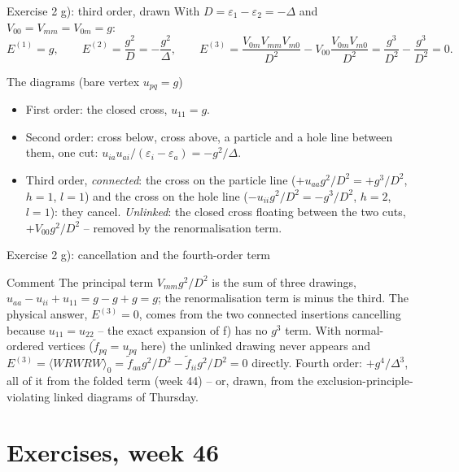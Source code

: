 \documentclass[aspectratio=169,10pt]{beamer}
\newcommand{\av}[1]{\langle #1\rangle_0}
\newcommand{\ftil}[1]{\tilde f_{#1}}
\begin{document}
\begin{frame}{Exercise 2 g): third order, drawn}
With $D=\varepsilon_1-\varepsilon_2=-\Delta$ and $V_{00}=V_{mm}=V_{0m}=g$:
\[
E^{(1)}=g,\qquad E^{(2)}=\frac{g^2}{D}=-\frac{g^2}{\Delta},\qquad
E^{(3)}=\frac{V_{0m}V_{mm}V_{m0}}{D^2}-V_{00}\frac{V_{0m}V_{m0}}{D^2}=\frac{g^3}{D^2}-\frac{g^3}{D^2}=0 .
\]
\begin{block}{The diagrams (bare vertex $u_{pq}=g$)}
\begin{itemize}
\item First order: the closed cross, $u_{11}=g$.
\item Second order: cross below, cross above, a particle and a hole line between them, one cut: $u_{ia}u_{ai}/(\varepsilon_i-\varepsilon_a)=-g^2/\Delta$.
\item Third order, \emph{connected}: the cross on the particle line ($+u_{aa}g^2/D^2=+g^3/D^2$, $h=1$, $l=1$) and the cross on the hole line ($-u_{ii}g^2/D^2=-g^3/D^2$, $h=2$, $l=1$): they cancel. \emph{Unlinked}: the closed cross floating between the two cuts, $+V_{00}g^2/D^2$ -- removed by the renormalisation term.
\end{itemize}
\end{block}
\end{frame}

\begin{frame}{Exercise 2 g): cancellation and the fourth-order term}
\begin{block}{Comment}
The principal term $V_{mm}g^2/D^2$ is the sum of three drawings, $u_{aa}-u_{ii}+u_{11}=g-g+g=g$; the renormalisation term is minus the third. The physical answer, $E^{(3)}=0$, comes from the two connected insertions cancelling because $u_{11}=u_{22}$ -- the exact expansion of f) has no $g^3$ term. With normal-ordered vertices ($\ftil{pq}=u_{pq}$ here) the unlinked drawing never appears and $E^{(3)}=\av{WRWRW}=\ftil{aa}g^2/D^2-\ftil{ii}g^2/D^2=0$ directly. Fourth order: $+g^4/\Delta^3$, all of it from the folded term (week 44) -- or, drawn, from the exclusion-principle-violating linked diagrams of Thursday.
\end{block}

\end{frame}

\section{Exercises, week 46}
\end{document}
